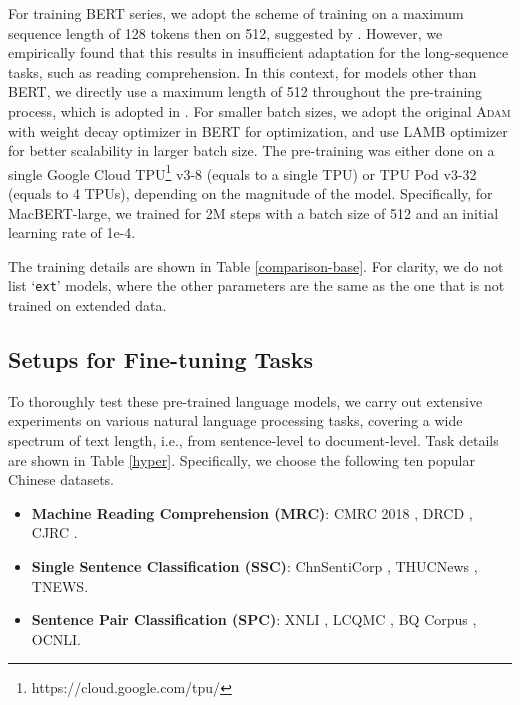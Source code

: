 \documentclass[journal]{IEEEtran}
\begin{document}
\begin{CJK*}{UTF8}{gbsn}
For training BERT series, we adopt the scheme of training on a maximum sequence length of 128 tokens then on 512, suggested by \cite{devlin-etal-2019-bert}.
However, we empirically found that this results in insufficient adaptation for the long-sequence tasks, such as reading comprehension.
In this context, for models other than BERT, we directly use a maximum length of 512 throughout the pre-training process, which is adopted in \cite{liu2019roberta}.
For smaller batch sizes, we adopt the original \textsc{Adam} \cite{kingma2014adam} with weight decay optimizer in BERT for optimization, and use \textsc{LAMB} optimizer \cite{you2019reducing} for better scalability in larger batch size.
The pre-training was either done on a single Google Cloud TPU\footnote{https://cloud.google.com/tpu/} v3-8 (equals to a single TPU) or TPU Pod v3-32 (equals to 4 TPUs), depending on the magnitude of the model. 
Specifically, for MacBERT-large, we trained for 2M steps with a batch size of 512 and an initial learning rate of 1e-4.

The training details are shown in Table \ref{comparison-base}. 
For clarity, we do not list `{\tt ext}' models, where the other parameters are the same as the one that is not trained on extended data.

\subsection{Setups for Fine-tuning Tasks}
To thoroughly test these pre-trained language models, we carry out extensive experiments on various natural language processing tasks, covering a wide spectrum of text length, i.e., from sentence-level to document-level. Task details are shown in Table \ref{hyper}.
Specifically, we choose the following ten popular Chinese datasets.
\begin{itemize}[leftmargin=*]
	\item {\bf Machine Reading Comprehension (MRC)}: CMRC 2018 \cite{cui-emnlp2019-cmrc2018}, DRCD \cite{shao2018drcd}, CJRC \cite{duan2019cjrc}.
	\item {\bf Single Sentence Classification (SSC)}: ChnSentiCorp \cite{tan2008empirical}, THUCNews \cite{li2007scalable}, TNEWS\cite{clue}.
	\item {\bf Sentence Pair Classification (SPC)}: XNLI \cite{conneau2018xnli}, LCQMC \cite{liu2018lcqmc}, BQ Corpus \cite{chen-etal-2018-bq}, OCNLI\cite{ocnli}.
\end{itemize}


\end{CJK*}
\end{document}
